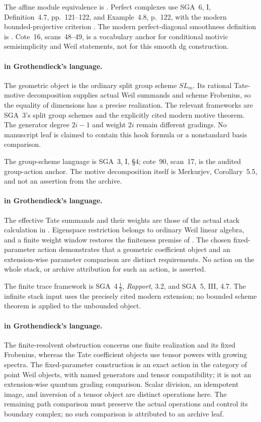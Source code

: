 The affine module equivalence is
\cite[Lemma~26.7.5, tag~01IB]{StacksAffine}.
Perfect complexes use SGA~6, I, Definition~4.7, pp.~121--122,
and Example~4.8, p.~122, with the modern bounded-projective criterion
\cite[Definition~15.76.1, tag~0657]{StacksAffine}.
The modern perfect-diagonal smoothness definition is
\cite[\S5.1, pp.~13--14]{TabuadaWeil}. Cote~16, scans~48--49, is a vocabulary anchor for conditional motivic semisimplicity and Weil statements, not for this smooth dg construction.


\paragraph{ in Grothendieck's language.}
The geometric object is the ordinary split group scheme $SL_m$.
Its rational Tate-motive decomposition supplies actual Weil
summands and scheme Frobenius, so the equality of dimensions
has a precise realization. The relevant frameworks are SGA~3's
split group schemes and the explicitly cited modern motive
theorem. The generator degree $2i-1$ and weight $2i$ remain
different gradings. No manuscript leaf is claimed to contain
this hook formula or a nonstandard basis comparison.


The group-scheme language is SGA~3, I, \S4; cote~90, scan~17, is the audited group-action anchor. The motive decomposition itself is Merkurjev, Corollary~5.5, and not an assertion from the archive.


\paragraph{ in Grothendieck's language.}
The effective Tate summands and their weights are those of the
actual stack calculation in . Eigenspace restriction
belongs to ordinary Weil linear algebra, and a finite weight
window restores the finiteness premise of .
The chosen fixed-parameter action demonstrates that a geometric
coefficient object and an extension-wise parameter comparison
are distinct requirements. No action on the whole stack, or
archive attribution for such an action, is asserted.

The finite trace framework is SGA~4\,$\frac12$, \emph{Rapport}, 3.2, and SGA~5, III, 4.7. The infinite stack input uses the precisely cited modern extension; no bounded scheme theorem is applied to the unbounded object.


\paragraph{ in Grothendieck's language.}
The finite-resolvent obstruction concerns one finite realization
and its fixed Frobenius, whereas the Tate coefficient objects
use tensor powers with growing spectra. The fixed-parameter
construction is an exact action in the category of point Weil
objects, with named generators and tensor compatibility; it is
not an extension-wise quantum grading comparison. Scalar
division, an idempotent image, and inversion of a tensor object
are distinct operations here. The remaining path comparison
must preserve the actual operations and control its boundary
complex; no such comparison is attributed to an archive leaf.

